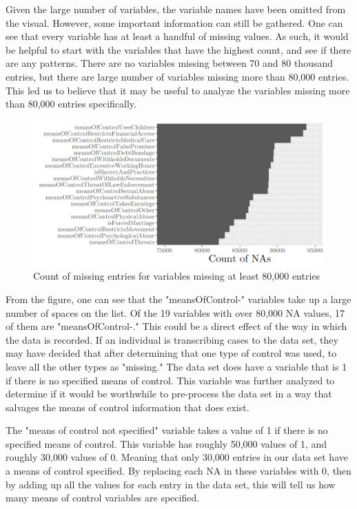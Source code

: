 \documentclass{article} %
\begin{document}
	Given the large number of variables, the variable names have been omitted from the visual. However, some important information can still be gathered. One can see that every variable has at least a handful of missing values. As such, it would be helpful to start with the variables that have the highest count, and see if there are any patterns. There are no variables missing between 70 and 80 thousand entries, but there are large number of variables missing more than 80,000 entries. This led us to believe that it may be useful to analyze the variables missing more than 80,000 entries specifically.
	
	\begin{figure}[H]
		\includegraphics[width = \textwidth]{NABarplot2}
		\caption{Count of missing entries for variables missing at least 80,000 entries}
		\label{fig:NABarplot2}
	\end{figure}
	
	From the figure, one can see that the "meansOfControl-" variables take up a large number of spaces on the list. Of the 19 variables with over 80,000 NA values, 17 of them are "meansOfControl-." This could be a direct effect of the way in which the data is recorded. If an individual is transcribing cases to the data set, they may have decided that after determining that one type of control was used, to leave all the other types as "missing." The data set does have a variable that is 1 if there is no specified means of control. This variable was further analyzed to determine if it would be worthwhile to pre-process the data set in a way that salvages the means of control information that does exist.
	
	The "means of control not specified" variable takes a value of 1 if there is no specified means of control. This variable has roughly 50,000 values of 1, and roughly 30,000 values of 0. Meaning that only 30,000 entries in our data set have a means of control specified. By replacing each NA in these variables with 0, then by adding up all the values for each entry in the data set, this will tell us how many means of control variables are specified.
	
\end{document}
